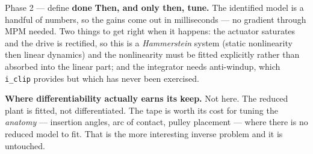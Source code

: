 \documentclass[11pt,a4paper]{article}
\newcommand{\code}[1]{\texttt{#1}}
\newcommand{\dn}{\textcolor{good}{\textbf{done}}}
\begin{document}
\begin{phasebox}{Phase 2 --- define \hfill \dn}
\textbf{Then, and only then, tune.} The identified model is a handful of numbers, so the gains come
out in milliseconds --- no gradient through MPM needed. Two things to get right when it happens:
the actuator saturates and the drive is rectified, so this is a \emph{Hammerstein} system (static
nonlinearity then linear dynamics) and the nonlinearity must be fitted explicitly rather than
absorbed into the linear part; and the integrator needs anti-windup, which \code{i\_clip} provides
but which has never been exercised.

\textbf{Where differentiability actually earns its keep.} Not here. The reduced plant is fitted, not
differentiated. The tape is worth its cost for tuning the \emph{anatomy} --- insertion angles, arc
of contact, pulley placement --- where there is no reduced model to fit. That is the more
interesting inverse problem and it is untouched.
\end{phasebox}
\end{document}
